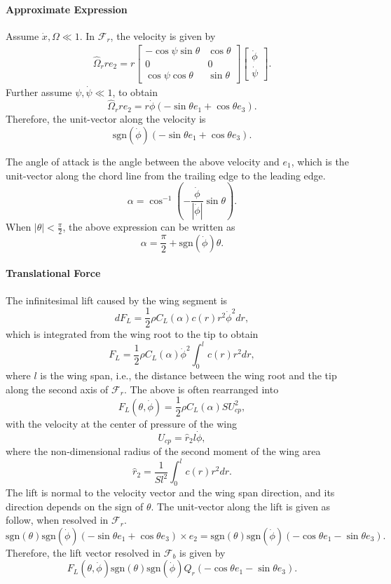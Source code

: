 \documentclass[10pt]{article}
\begin{document}
\paragraph{Approximate Expression}

Assume $\dot x, \Omega\ll 1$. 
In $\mathcal{F}_r$, the velocity is given by
\begin{align*}
    \hat \Omega_r r e_2 = 
    r  \begin{bmatrix}
        -\cos\psi\sin\theta & \cos\theta \\
        0 & 0 \\
    \cos\psi\cos\theta &  \sin\theta\end{bmatrix}
    \begin{bmatrix}
        \dot\phi \\ \dot\psi
    \end{bmatrix}.
\end{align*}
Further assume $\psi,\dot\psi \ll  1$, to obtain
\[
    \hat\Omega_r r e_2 = r \dot\phi (-\sin\theta e_1 + \cos\theta e_3) .
\]
Therefore, the unit-vector along the velocity is 
\[
    \mathrm{sgn}(\dot\phi) (-\sin\theta e_1 + \cos\theta e_3) .
\]

The angle of attack is the angle between the above velocity and $e_1$, which is the unit-vector along the chord line from the trailing edge to the leading edge.
\[
    \alpha = \cos^{-1} (-\frac{\dot\phi}{|\dot\phi|} \sin\theta).
\]
When $|\theta|<\frac{\pi}{2}$, the above expression can be written as
\[
    \alpha = \frac{\pi}{2} + \mathrm{sgn}(\dot\phi) \theta.
\]


\paragraph{Translational Force}

The infinitesimal lift caused by the wing segment is 
\[
    dF_L = \frac{1}{2}\rho C_L(\alpha) c(r) r^2 \dot\phi^2 dr,
\]
which is integrated from the wing root to the tip to obtain
\[
    F_L = \frac{1}{2}\rho C_L(\alpha) \dot\phi^2 \int_{0}^l c(r) r^2 dr,
\]
where $l$ is the wing span, i.e., the distance between the wing root and the tip along the second axis of $\mathcal{F}_r$.
The above is often rearranged into 
\[
    F_L(\theta,\dot\phi) = \frac{1}{2}\rho  C_L(\alpha) S U_{cp}^2,
\]
with the velocity at the center of pressure of the wing 
\[
    U_{cp} = \hat r_2 l \dot\phi,
\]
where the non-dimensional radius of the second moment of the wing area
\[
    \hat r_2 = \frac{1}{S l^2} \int_0^l c(r) r^2 dr.
\]
The lift is normal to the velocity vector and the wing span direction, and its direction depends on the sign of $\theta$.
The unit-vector along the lift is given as follow, when resolved in $\mathcal{F}_r$.
\[
    \mathrm{sgn}(\theta) \mathrm{sgn}(\dot\phi) (-\sin\theta e_1 + \cos\theta e_3)\times e_2 =\mathrm{sgn}(\theta) \mathrm{sgn}(\dot\phi) (-\cos\theta e_1 - \sin\theta e_3).
\]
Therefore, the lift vector resolved in $\mathcal{F}_b$ is given by
\[
    F_L(\theta,\dot\phi) \mathrm{sgn}(\theta) \mathrm{sgn}(\dot\phi) Q_r  (-\cos\theta e_1 - \sin\theta e_3).
\]
\end{document}
